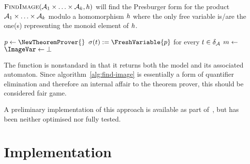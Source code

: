 \documentclass[acmsmall,review,anonymous,screen]{acmart}\settopmatter{printfolios=true,printccs=true,printacmref=true}
\theoremstyle{definition}
\begin{document}
  \begin{algorithm}
    \DontPrintSemicolon
    \caption{$\textsc{FindImage}{}(\mathcal{A}_1 \times \ldots \times \mathcal{A}_k, h)$ will find the Presburger form for the product $\mathcal{A}_1 \times \ldots \times \mathcal{A}_k$ modulo a homomorphism $h$ where the only free variable is/are the one(s) representing the monoid element of $h$.}\label{alg:find-image}
  
$p \gets \NewTheoremProver{}$\;
$\Filter(\Transition) := \FreshVariable{p}$ for every $t \in \delta_{\mathcal{A}}$\;
$m \gets$ \;
\;
$\ImageVar \gets \bot$\;
    \KwRet{\ImageVar}
    \end{algorithm}

    The \GetModel{} function is nonstandard in that it returns both the model
    and its associated automaton. Since algorithm~\ref{alg:find-image} is
    essentially a form of quantifier elimination and therefore an internal affair
    to the theorem prover, this should be considered fair game.
    
    A preliminary implementation of this approach is available as part
    of~\Catra, but has been neither optimised nor fully tested.

\section{Implementation}\label{sec:implementation}
\end{document}
